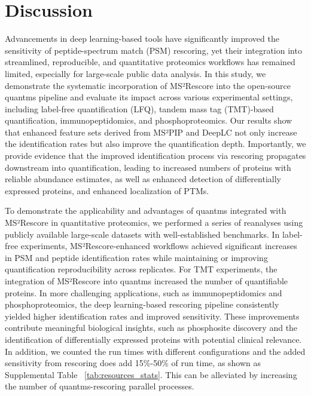 \documentclass[12pt]{article}
\begin{document}
\section{Discussion}
Advancements in deep learning-based tools have significantly improved the sensitivity of peptide-spectrum match (PSM) rescoring, yet their integration into streamlined, reproducible, and quantitative %
proteomics workflows has remained limited, especially for large-scale public data analysis. In this study, we demonstrate the systematic incorporation of MS²Rescore into the open-source quantms pipeline and evaluate its impact across various experimental settings, including label-free quantification (LFQ), tandem mass tag (TMT)-based quantification, immunopeptidomics, and phosphoproteomics. Our results show that enhanced feature sets derived from MS²PIP and DeepLC not only increase the identification rates but also improve the quantification depth. Importantly, we provide evidence that the improved identification process via rescoring propagates downstream into quantification, leading to increased numbers of proteins with reliable abundance estimates, as well as enhanced detection of differentially expressed proteins, and enhanced localization of PTMs. %

To demonstrate the applicability and advantages of quantms integrated with MS²Rescore in quantitative proteomics, we performed a series of reanalyses using publicly available large-scale datasets with well-established benchmarks. In label-free experiments, MS²Rescore-enhanced workflows achieved significant increases in PSM and peptide identification rates while maintaining or improving quantification reproducibility across replicates. For TMT experiments, the integration of MS²Rescore into quantms increased the number of quantifiable proteins. In more challenging applications, such as immunopeptidomics and phosphoproteomics, the deep learning-based rescoring pipeline consistently yielded higher identification rates and improved sensitivity. These improvements contribute meaningful biological insights, such as phosphosite discovery and the identification of differentially expressed proteins with potential clinical relevance. In addition, we counted the run times with different configurations and the added sensitivity from rescoring does add 15\%-50\% of run time, as shown as Supplemental Table ~\ref{tab:resources_stats}. This can be alleviated by increasing the number of quantms-rescoring parallel processes. %
\end{document}

